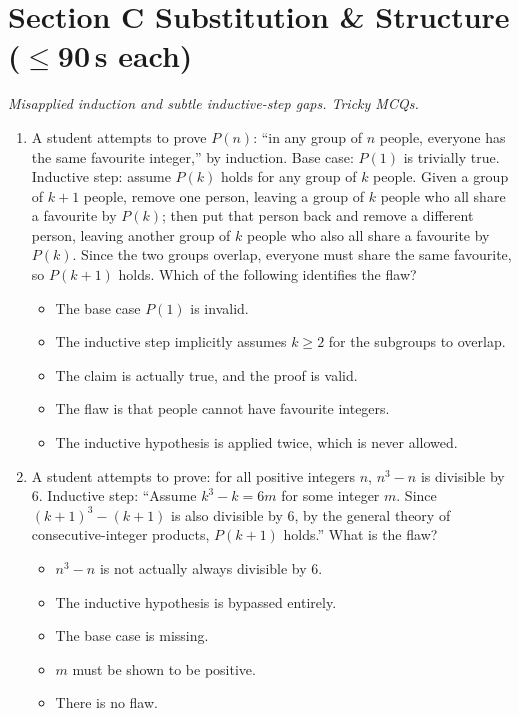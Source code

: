 \documentclass[11pt,a4paper]{article}
\begin{document}
\section*{Section C \quad Substitution \& Structure \hfill{\normalfont\small($\leq$90\,s each)}}

\noindent\textit{Misapplied induction and subtle inductive-step gaps. Tricky MCQs.}

\begin{enumerate}

\item A student attempts to prove $P(n)$: ``in any group of $n$ people, everyone has the same favourite integer,'' by induction. Base case: $P(1)$ is trivially true. Inductive step: assume $P(k)$ holds for any group of $k$ people. Given a group of $k+1$ people, remove one person, leaving a group of $k$ people who all share a favourite by $P(k)$; then put that person back and remove a different person, leaving another group of $k$ people who also all share a favourite by $P(k)$. Since the two groups overlap, everyone must share the same favourite, so $P(k+1)$ holds. Which of the following identifies the flaw?
\begin{itemize}
\item[A)] The base case $P(1)$ is invalid.
\item[B)] The inductive step implicitly assumes $k\geq2$ for the subgroups to overlap.
\item[C)] The claim is actually true, and the proof is valid.
\item[D)] The flaw is that people cannot have favourite integers.
\item[E)] The inductive hypothesis is applied twice, which is never allowed.
\end{itemize}

\item A student attempts to prove: for all positive integers $n$, $n^3-n$ is divisible by $6$. Inductive step: ``Assume $k^3-k=6m$ for some integer $m$. Since $(k+1)^3-(k+1)$ is also divisible by $6$, by the general theory of consecutive-integer products, $P(k+1)$ holds.'' What is the flaw?
\begin{itemize}
\item[A)] $n^3-n$ is not actually always divisible by $6$.
\item[B)] The inductive hypothesis is bypassed entirely.
\item[C)] The base case is missing.
\item[D)] $m$ must be shown to be positive.
\item[E)] There is no flaw.
\end{itemize}


\end{enumerate}
\end{document}
